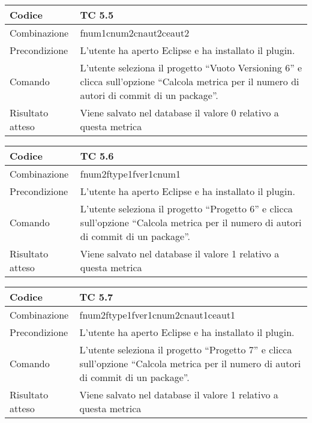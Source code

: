\begin{table}[ht]
\begin{tabular}{|p{3cm}|p{9cm}|}
\hline
\cellcolor{lightgray}Codice				& TC 5.5								\\
\hline
\cellcolor{lightgray}Combinazione		& fnum1cnum2cnaut2ceaut2 									\\
\hline
\cellcolor{lightgray}Precondizione		& L'utente ha aperto Eclipse e ha installato il plugin.			\\
\hline
\cellcolor{lightgray}Comando			& L'utente seleziona il progetto ``Vuoto Versioning 6''  e clicca sull'opzione ``Calcola metrica per il numero di autori di commit di un package''.	\\
\hline
\cellcolor{lightgray}Risultato atteso	& Viene salvato nel database il valore 0 relativo a questa metrica	\\
\hline
\end{tabular}
\end{table}

\begin{table}[ht]
\begin{tabular}{|p{3cm}|p{9cm}|}
\hline
\cellcolor{lightgray}Codice				& TC 5.6								\\
\hline
\cellcolor{lightgray}Combinazione		& fnum2ftype1fver1cnum1								\\
\hline
\cellcolor{lightgray}Precondizione		& L'utente ha aperto Eclipse e ha installato il plugin.				\\
\hline
\cellcolor{lightgray}Comando			& L'utente seleziona il progetto ``Progetto 6''  e clicca sull'opzione ``Calcola metrica per il numero di autori di commit di un package''.	\\
\hline
\cellcolor{lightgray}Risultato atteso	& Viene salvato nel database il valore 1 relativo a questa metrica	\\
\hline
\end{tabular}
\end{table}

\begin{table}[ht]
\begin{tabular}{|p{3cm}|p{9cm}|}
\hline
\cellcolor{lightgray}Codice				& TC 5.7								\\
\hline
\cellcolor{lightgray}Combinazione		& fnum2ftype1fver1cnum2cnaut1ceaut1							\\
\hline
\cellcolor{lightgray}Precondizione		& L'utente ha aperto Eclipse e ha installato il plugin.									\\
\hline
\cellcolor{lightgray}Comando			& L'utente seleziona il progetto ``Progetto 7''  e clicca sull'opzione ``Calcola metrica per il numero di autori di commit di un package''.	\\
\hline
\cellcolor{lightgray}Risultato atteso	& Viene salvato nel database il valore 1 relativo a questa metrica	\\
\hline
\end{tabular}
\end{table}

